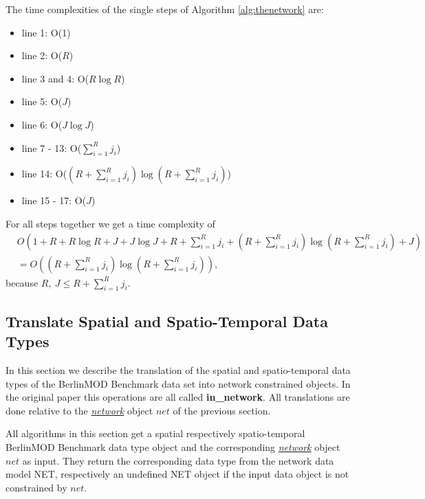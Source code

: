 \documentclass[a4paper]{article}
\newcommand{\bmodb} {BerlinMOD Benchmark}
\newcommand{\op}[1]{\textbf{#1}}
\newcommand{\dt}[1]{\textsl{\underline{#1}}}
\begin{document}
The time complexities of the single steps of Algorithm \ref{alg:thenetwork} are:
\begin{itemize}
  \item[] line 1: O(1)
  \item[] line 2: O($R$)
  \item[] line 3 and 4: O($R \log R$)
  \item[] line 5: O($J$)
  \item[] line 6: O($J \log J$)
  \item[] line 7 - 13: O($\sum_{i=1}^{R}{j_i}$)
  \item[] line 14: O($(R + \sum_{i=1}^{R}{j_i}) \log ({R + \sum_{i=1}^{R}{j_i}})$)
  \item[] line 15 - 17: O($J$)
\end{itemize}
For all steps together we get a time complexity of
\begin{align*}
&O(1 + R + R \log R + J + J \log J + R + \sum_{i=1}^{R}{j_i} + (R + \sum_{i=1}^{R}{j_i}) \log (R + \sum_{i=1}^{R}{j_i}) + J)\\
&= O((R + \sum_{i=1}^{R}{j_i}) \log (R  + \sum_{i=1}^{R}{j_i})),
\end{align*}
because $R,\ J \leq R + \sum_{i=1}^{R}{j_i}$.
\subsection{Translate Spatial and Spatio-Temporal Data Types}
\label{sec:translateSTdata}
In this section we describe the translation of the spatial and spatio-temporal
data types of the \bmodb{} data set into network constrained
objects. In the original paper this operations are all called \op{in\_network}.
All translations are done relative to the \dt{network} object $net$ of the
previous section.

All algorithms in this section get a spatial respectively spatio-temporal \bmodb{}
data type object and the corresponding \dt{network} object $net$ as input.
They return the corresponding data type from the network data model NET,
respectively an undefined NET object if the input data object is not constrained
by $net$.
\end{document}
